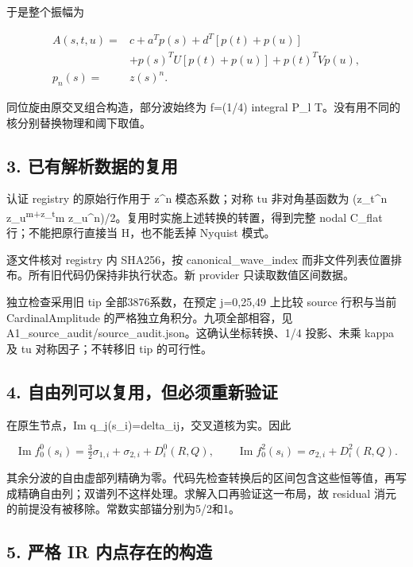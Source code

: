 \documentclass[
  11pt,
  a4paper,
]{article}
\begin{document}
于是整个振幅为

\[
\begin{aligned}
A(s,t,u)={}&c+a^Tp(s)+d^T[p(t)+p(u)]\\
&+p(s)^TU[p(t)+p(u)]+p(t)^TVp(u),\\
p_n(s)={}&z(s)^n.
\end{aligned}
\]

同位旋由原交叉组合构造，部分波始终为 f=(1/4) integral P\_l
T。没有用不同的核分别替换物理和阈下取值。

\subsection{3.
已有解析数据的复用}\label{ux5df2ux6709ux89e3ux6790ux6570ux636eux7684ux590dux7528}

认证 registry 的原始行作用于 z\^{}n 模态系数；对称 tu 非对角基函数为
(z\_t\^{}n z\_u\textsuperscript{m+z\_t}m
z\_u\^{}n)/2。复用时实施上述转换的转置，得到完整 nodal C\_flat
行；不能把原行直接当 H，也不能丢掉 Nyquist 模式。

逐文件核对 registry 内 SHA256，按 canonical\_wave\_index
而非文件列表位置排布。所有旧代码仍保持非执行状态。新 provider
只读取数值区间数据。

独立检查采用旧 tip 全部3876系数，在预定 j=0,25,49 上比较 source
行积与当前 CardinalAmplitude 的严格独立角积分。九项全部相容，见
A1\_source\_audit/source\_audit.json。这确认坐标转换、1/4 投影、未乘
kappa 及 tu 对称因子；不转移旧 tip 的可行性。

\subsection{4.
自由列可以复用，但必须重新验证}\label{ux81eaux7531ux5217ux53efux4ee5ux590dux7528ux4f46ux5fc5ux987bux91cdux65b0ux9a8cux8bc1}

在原生节点，Im q\_j(s\_i)=delta\_ij，交叉道核为实。因此

\[
\operatorname{Im} f^0_0(s_i)=\tfrac32\sigma_{1,i}+\sigma_{2,i}+D^0_i(R,Q),
\qquad
\operatorname{Im} f^2_0(s_i)=\sigma_{2,i}+D^2_i(R,Q).
\]

其余分波的自由虚部列精确为零。代码先检查转换后的区间包含这些恒等值，再写成精确自由列；双谱列不这样处理。求解入口再验证这一布局，故
residual 消元的前提没有被移除。常数实部锚分别为5/2和1。

\subsection{5. 严格 IR
内点存在的构造}\label{ux4e25ux683c-ir-ux5185ux70b9ux5b58ux5728ux7684ux6784ux9020}
\end{document}
